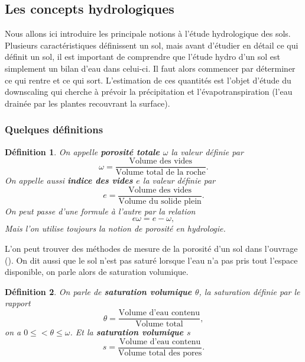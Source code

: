 \documentclass[a4paper,10pt]{article}
\newtheorem{definition}{Définition}
\begin{document}
\subsection{Les concepts hydrologiques}
\label{hydro}

Nous allons ici introduire les principale notions à l'étude hydrologique des sols. Plusieurs caractéristiques définissent un sol, mais avant d'étudier en détail ce qui définit un sol, il est important de comprendre que l'étude hydro d'un sol est simplement un bilan d'eau dans celui-ci. Il faut alors commencer par déterminer ce qui rentre et ce qui sort. L'estimation de ces quantités est l'objet d'étude du downscaling qui cherche à prévoir la précipitation et l'évapotranspiration (l'eau drainée par les plantes recouvrant la surface).

\subsubsection{Quelques définitions}

\label{modelisation}
\begin{definition}
	On appelle \textbf{porosité totale $\omega$} la valeur définie par
	\begin{equation}
		\omega =\frac{\textrm{Volume des vides}}{\textrm{Volume total de la roche}}.
	\end{equation}
	On appelle aussi \textbf{indice des vides $e$} la valeur définie par 
	\begin{equation}
		e=\frac{\textrm{Volume des vides}}{\textrm{Volume du solide plein}}.
	\end{equation}
	On peut passe d'une formule à l'autre par la relation 
	\[e\omega=e-\omega,\]
	Mais l'on utilise toujours la notion de porosité en hydrologie. 
\end{definition}
L'on peut trouver des méthodes de mesure de la porosité d'un sol dans l'ouvrage (\cite{marsily_de1986quantitative}). On dit aussi que le sol n'est pas saturé lorsque l'eau n'a pas pris tout l'espace disponible, on parle alors de saturation volumique.
\begin{definition}
	On parle de \textbf{saturation volumique $\theta$}, la saturation définie par le rapport
	\begin{equation}
		\theta= \frac{\textrm{Volume d'eau contenu}}{\textrm{Volume total}},
	\end{equation}
	on a $0\leq<\theta\leq \omega$. Et la \textbf{saturation volumique $s$}
	\begin{equation}
		s=\frac{\textrm{Volume d'eau contenu}}{\textrm{Volume total des pores}}.
	\end{equation}
\end{definition}
\end{document}
